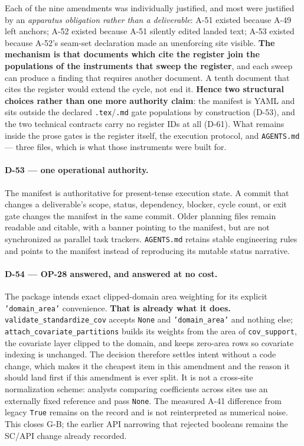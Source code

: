 \documentclass[
  10pt,
]{article}
\begin{document}
Each of the nine amendments was individually justified, and most were justified
by an \emph{apparatus obligation rather than a deliverable}: A-51 existed
because A-49 left anchors; A-52 existed because A-51 silently edited landed
text; A-53 existed because A-52's seam-set declaration made an unenforcing site
visible. \textbf{The mechanism is that documents which cite the register join
the populations of the instruments that sweep the register}, and each sweep can
produce a finding that requires another document. A tenth document that cites
the register would extend the cycle, not end it. \textbf{Hence two structural
choices rather than one more authority claim}: the manifest is YAML and sits
outside the declared \texttt{.tex}/\texttt{.md} gate populations by
construction (D-53), and the two technical contracts carry no register IDs at
all (D-61). What remains inside the prose gates is the register itself, the
execution protocol, and \texttt{AGENTS.md} --- three files, which is what those
instruments were built for.

\paragraph{D-53 --- one operational authority.}

The manifest is authoritative for present-tense execution state. A commit that
changes a deliverable's scope, status, dependency, blocker, cycle count, or
exit gate changes the manifest in the same commit. Older planning files remain
readable and citable, with a banner pointing to the manifest, but are not
synchronized as parallel task trackers. \texttt{AGENTS.md} retains stable
engineering rules and points to the manifest instead of reproducing its mutable
status narrative.

\paragraph{D-54 --- OP-28 answered, and answered at no cost.}

The package intends exact clipped-domain area weighting for its explicit
\texttt{'domain\_area'} convenience. \textbf{That is already what it does.}
\texttt{validate\_standardize\_cov} accepts \texttt{None} and
\texttt{'domain\_area'} and nothing else; \texttt{attach\_covariate\_partitions}
builds its weights from the area of \texttt{cov\_support}, the covariate layer
clipped to the domain, and keeps zero-area rows so covariate indexing is
unchanged. The decision therefore settles intent without a code change, which
makes it the cheapest item in this amendment and the reason it should land
first if this amendment is ever split. It is not a cross-site normalization
scheme: analysts comparing coefficients across sites use an externally fixed
reference and pass \texttt{None}. The measured A-41 difference from legacy
\texttt{True} remains on the record and is not reinterpreted as numerical
noise. This closes G-B; the earlier API narrowing that rejected booleans remains
the SC/API change already recorded.
\end{document}

